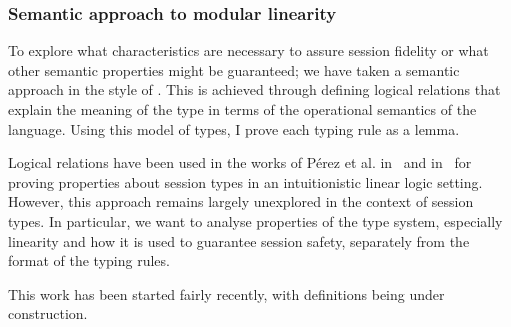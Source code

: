\begin{frame}\frametitle{Semantic approach to modular linearity}
  To explore what characteristics are necessary to assure session fidelity or what other semantic properties might be guaranteed; we have taken a semantic approach in the style of \cite{Ahmed:2004:STM:1037736}. This is achieved through defining logical relations that explain the meaning of the type in terms of the operational semantics of the language. Using this model of types, I prove each typing rule as a lemma.

  Logical relations have been used in the works of P{\'e}rez et al. in~\cite{  10.1007/978-3-642-28869-2_27} and in~\cite{PEREZ2014254} for proving properties about session types in an intuitionistic linear logic setting. However, this approach remains largely unexplored in the context of session types.
  In particular, we want to analyse properties of the type system, especially linearity and how it is used to guarantee session safety, separately from the format of the typing rules.

  This work has been started fairly recently, with definitions being under construction.

\end{frame}
